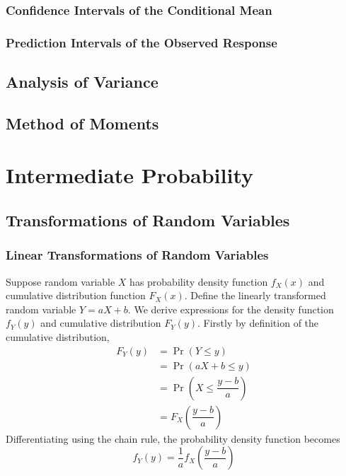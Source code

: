 \documentclass[11pt]{report} %
\begin{document}
\subsection{Confidence Intervals of the Conditional Mean}

\subsection{Prediction Intervals of the Observed Response}

\section{Analysis of Variance}

\section{Method of Moments}

\chapter{Intermediate Probability}

\section{Transformations of Random Variables}

\subsection{Linear Transformations of Random Variables}

Suppose random variable $X$ has probability density function $f_{X}\left(x\right)$ and cumulative distribution function $F_{X}\left(x\right)$. Define the linearly transformed random variable $Y = aX + b$. We derive expressions for the density function $f_{Y}\left(y\right)$ and cumulative distribution $F_{Y}\left(y\right)$. Firstly by definition of the cumulative distribution,
\begin{align}
F_{Y}\left(y\right) &= \operatorname{Pr}\left(Y \leq y\right) \\
&= \operatorname{Pr}\left(aX + b \leq y\right) \\
&= \operatorname{Pr}\left(X \leq \dfrac{y - b}{a}\right) \\
&= F_{X}\left(\dfrac{y - b}{a}\right)
\end{align}
Differentiating using the chain rule, the probability density function becomes
\begin{equation}
f_{Y}\left(y\right) = \dfrac{1}{a}f_{X}\left(\dfrac{y - b}{a}\right)
\end{equation}
\end{document}
